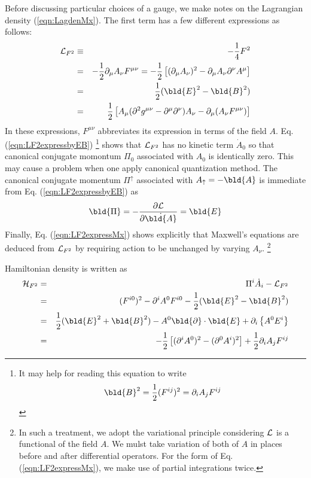 Before discussing particular choices of a gauge, 
we make notes on the Lagrangian density (\ref{eqn:LagdenMx}).
The first term has a few different expressions as follows:
\begin{eqnarray}
{\cal L}_{F^2} 
&\equiv&
 - \frac{1}{4} F^2
\nonumber\\
&=&
- \frac{1}{2} \partial_\mu A_\nu F^{\mu \nu}
=
- \frac{1}{2}
\left[
(\partial_\mu A_\nu)^2 
- \partial_\mu A_\nu \partial^\nu A^\mu
\right]
\label{eqn:LF2expressbyA}
\\
&=&
\frac{1}{2}
( \bld{E}^2 - \bld{B}^2 )
\label{eqn:LF2expressbyEB}
\\
&=&
\frac{1}{2}
\left[
A_\mu 
(\partial^2 g^{\mu \nu} - \partial^\mu \partial^\nu) A_\nu
-
\partial_\mu (A_\nu F^{\mu \nu})
\right]
\label{eqn:LF2expressMx}
\end{eqnarray}
In these expressions, $F^{\mu \nu}$ abbreviates its expression in terms of the field $A$.
Eq. (\ref{eqn:LF2expressbyEB})
\footnote{%
It may help for reading this equation to write
\begin{eqnarray}
\bld{B}^2 = \frac{1}{2} (F^{ij})^2 = \partial_i A_j F^{ij}
\end{eqnarray}
}%
 shows that ${\cal L}_{F^2}$
has no kinetic term $\dot{A}_0$ so that canonical conjugate
momontum $\Pi_0$ associated with $A_0$ is identically zero.
This may cause a problem when one apply canonical quantization method.
The canonical conjugate momentum $\Pi^{\uparrow}$ associated with $A_{\uparrow} = -\bld{A}$ is immediate
from Eq. (\ref{eqn:LF2expressbyEB}) as
\begin{eqnarray}
\bld{\Pi} = 
- \frac{\partial {\cal L}}{\partial \dot{\bld{A}}}
=
\bld{E}
\end{eqnarray}
Finally, Eq. (\ref{eqn:LF2expressMx}) shows explicitly that Maxwell's equations are
deduced from ${\cal L}_{F^2}$ by requiring action to be unchanged by
varying $A_\nu$.
\footnote{%
In such a treatment, we adopt the variational principle considering ${\cal L}$ is 
a functional of the field $A$.
We mulst take variation of both of $A$ in places before and after differential operators. 
For the form of Eq. (\ref{eqn:LF2expressMx}), we make use of partial integrations twice.
}%

Hamiltonian density is written as
\begin{eqnarray}
{\cal H}_{F^2} 
&=&
 \Pi^i \dot{A}_i - {\cal L}_{F^2}
\nonumber\\
&=&
(F^{i0})^2 - \partial^i A^0 F^{i0} - \frac{1}{2}(\bld{E}^2 - \bld{B}^2)
\nonumber\\
&=&
\frac{1}{2} (\bld{E}^2 + \bld{B}^2) 
- A^0 \bld{\partial}\cdot \bld{E}
+ \partial_i
\left\{
A^0 E^i
\right\}
\label{eqn:F2HamiltDensEB}
\\
&=&
-\frac{1}{2}
\left[
(\partial^i A^0)^2 - (\partial^0 A^i)^2
\right]
+
\frac{1}{2}
\partial_i A_j F^{ij}
\label{eqn:F2HamiltDensA}
\end{eqnarray}

